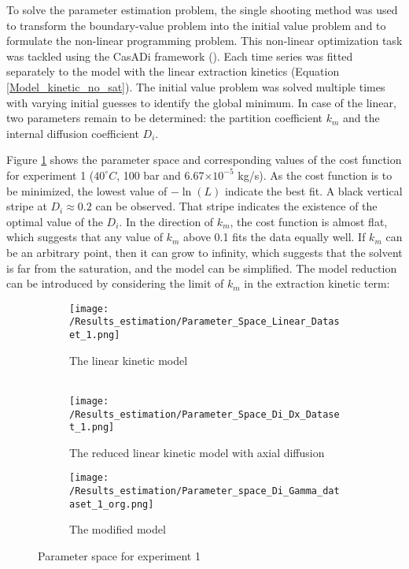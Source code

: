 \documentclass[../Supercritical_fluid_extraction_of_essential_oil_from_chamomile.tex]{subfiles}
\begin{document}
	
	\label{CH: Results}
		
	To solve the parameter estimation problem, the single shooting method was used to transform the boundary-value problem into the initial value problem and to formulate the non-linear programming problem. This non-linear optimization task was tackled using the CasADi framework (\citet{Andersson2018}). Each time series was fitted separately to the model with the linear extraction kinetics (Equation \ref{Model_kinetic_no_sat}). The initial value problem was solved multiple times with varying initial guesses to identify the global minimum. In case of the linear, two parameters remain to be determined: the partition coefficient $k_m$ and the internal diffusion coefficient $D_i$. 
	
	Figure \ref{fig: Fit_1_linear} shows the parameter space and corresponding values of the cost function for experiment 1 ($40^\circ C$, 100 bar and 6.67$\times 10^{-5}$ kg/s). As the cost function is to be minimized, the lowest value of $-\ln(L)$ indicate the best fit. A black vertical stripe at $D_i \approx 0.2$ can be observed. That stripe indicates the existence of the optimal value of the $D_i$. In the direction of $k_m$, the cost function is almost flat, which suggests that any value of $k_m$ above 0.1 fits the data equally well. If $k_m$ can be an arbitrary point, then it can grow to infinity, which suggests that the solvent is far from the saturation, and the model can be simplified. The model reduction can be introduced by considering the limit of $k_m$ in the extraction kinetic term:
	
	\begin{figure}[!h]
		\centering
		\begin{subfigure}{0.48\columnwidth}
			\centering
			\texttt{[image: /Results\_estimation/Parameter\_Space\_Linear\_Dataset\_1.png]}
			\caption{The linear kinetic model \\ ~}
			\label{fig: Fit_1_linear}
		\end{subfigure}
		\hfill
		\begin{subfigure}{0.48\columnwidth}
			\centering
			\texttt{[image: /Results\_estimation/Parameter\_Space\_Di\_Dx\_Dataset\_1.png]}
			\caption{The reduced linear kinetic model with axial diffusion}
			\label{fig: Fit_1_Di_Dx}
		\end{subfigure}
		\hfill
		\begin{subfigure}{0.48\columnwidth}
			\centering
			\texttt{[image: /Results\_estimation/Parameter\_space\_Di\_Gamma\_dataset\_1\_org.png]}
			\caption{The modified model}
			\label{fig: Fit_1_Di_Gamma}
		\end{subfigure}
		\caption{Parameter space for experiment 1}
	\end{figure}
		
\end{document}
